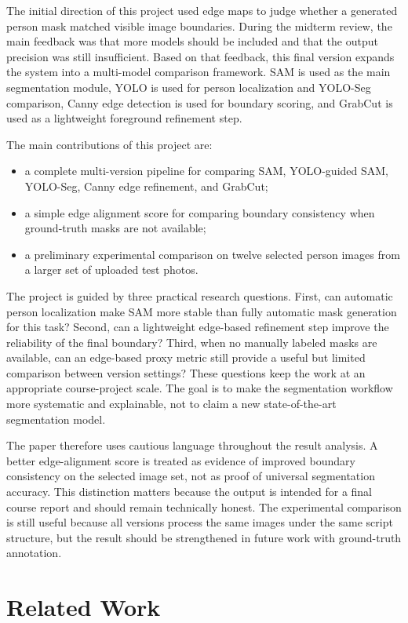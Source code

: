 \documentclass[conference]{IEEEtran}
\begin{document}
The initial direction of this project used edge maps to judge whether a generated person mask matched visible image boundaries. During the midterm review, the main feedback was that more models should be included and that the output precision was still insufficient. Based on that feedback, this final version expands the system into a multi-model comparison framework. SAM is used as the main segmentation module, YOLO is used for person localization and YOLO-Seg comparison, Canny edge detection is used for boundary scoring, and GrabCut is used as a lightweight foreground refinement step.

The main contributions of this project are:
\begin{itemize}
\item a complete multi-version pipeline for comparing SAM, YOLO-guided SAM, YOLO-Seg, Canny edge refinement, and GrabCut;
\item a simple edge alignment score for comparing boundary consistency when ground-truth masks are not available;
\item a preliminary experimental comparison on twelve selected person images from a larger set of uploaded test photos.
\end{itemize}

The project is guided by three practical research questions. First, can automatic person localization make SAM more stable than fully automatic mask generation for this task? Second, can a lightweight edge-based refinement step improve the reliability of the final boundary? Third, when no manually labeled masks are available, can an edge-based proxy metric still provide a useful but limited comparison between version settings? These questions keep the work at an appropriate course-project scale. The goal is to make the segmentation workflow more systematic and explainable, not to claim a new state-of-the-art segmentation model.

The paper therefore uses cautious language throughout the result analysis. A better edge-alignment score is treated as evidence of improved boundary consistency on the selected image set, not as proof of universal segmentation accuracy. This distinction matters because the output is intended for a final course report and should remain technically honest. The experimental comparison is still useful because all versions process the same images under the same script structure, but the result should be strengthened in future work with ground-truth annotation.

\section{Related Work}
\end{document}
